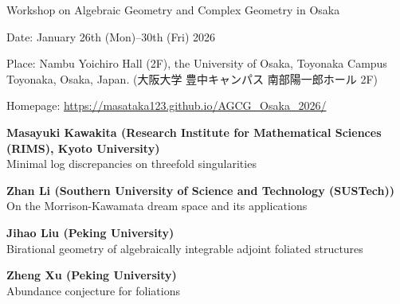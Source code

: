 \documentclass[dvipdfmx,a4paper,12pt]{article}
\theoremstyle{plain} %
\theoremstyle{definition} %
\begin{document}
\begin{center}
  {\LARGE Workshop on Algebraic Geometry and Complex Geometry in Osaka}
 
  \end{center}
  
\vskip5mm
\begin{flushleft}
{ Date: January 26th (Mon)--30th (Fri) 2026}


{ Place: Nambu Yoichiro Hall (2F), the University of Osaka, Toyonaka Campus Toyonaka, Osaka, Japan. (大阪大学 豊中キャンパス 南部陽一郎ホール 2F)}

Homepage: \url{https://masataka123.github.io/AGCG_Osaka_2026/}

\end{flushleft}




\vskip5mm
\begin{center}
\end{center}
\vskip3mm

\vskip1mm
{\bf Masayuki Kawakita (Research Institute for Mathematical Sciences (RIMS), Kyoto University)}\\
Minimal log discrepancies on threefold singularities
\vskip3mm

{\bf Zhan Li (Southern University of Science and Technology (SUSTech))}\\
On the Morrison-Kawamata dream space and its applications
\vskip3mm

{\bf Jihao Liu (Peking University)}\\
Birational geometry of algebraically integrable adjoint foliated structures
\vskip3mm

{\bf Zheng Xu (Peking University)}\\
Abundance conjecture for foliations
\vskip3mm
\end{document}
